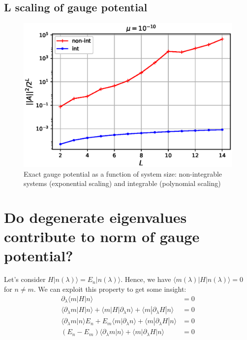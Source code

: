 \documentclass[11pt,a4paper]{article}
\begin{document}
\subsection{L scaling of gauge potential}

\begin{figure}[!ht]
\begin{center}
\includegraphics[scale=0.7]{new_pics/v2_1_norm_L_scaling.eps}
\caption{Exact gauge potential as a function of system size: non-integrable systems (exponential scaling) and integrable (polynomial scaling) }
\end{center}
\end{figure}


\appendix
\section{Do degenerate eigenvalues contribute to norm of gauge potential?}\label{sec.deg}
Let's consider $H | n(\lambda) \rangle= E_n  | n(\lambda) \rangle $. Hence, we have $\langle m(\lambda)  |  H | n(\lambda) \rangle=0$ for $n\neq m$. We can exploit this property to get some insight:
\begin{align*}
\partial_{\lambda}\langle m  |  H | n\rangle&=0\\
\langle \partial_{\lambda} m |  H | n \rangle + \langle  m  |  H |\partial_{\lambda} n \rangle + \langle  m  | \partial_{\lambda} H | n \rangle&=0\\
\langle \partial_{\lambda} m   | n \rangle E_n + E_m\langle  m  |   \partial_{\lambda} n \rangle + \langle  m  | \partial_{\lambda} H | n \rangle&=0\\
(E_n - E_m)\langle  \partial_{\lambda} m  |    n \rangle + \langle  m  | \partial_{\lambda} H | n \rangle&=0
\end{align*}
\end{document}
